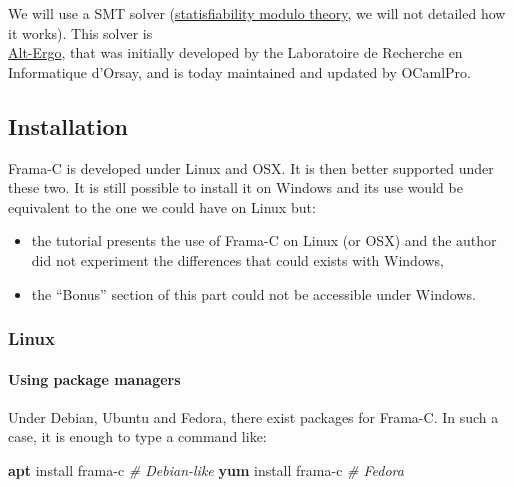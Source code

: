 \documentclass[12pt,francais,]{scrbook}
\newenvironment{Shaded}{}{}
\newcommand{\KeywordTok}[1]{\textcolor[rgb]{0.00,0.44,0.13}{\textbf{{#1}}}}
\newcommand{\CommentTok}[1]{\textcolor[rgb]{0.38,0.63,0.69}{\textit{{#1}}}}
\newcommand{\NormalTok}[1]{{#1}}
\newenvironment{zdsalertblock}[1]{%
  \tcolorbox[beamer,%
    noparskip,breakable,
    colback=LightCoral,colframe=DarkRed,%
    colbacklower=Tomato,%
    title=#1]
}{\endtcolorbox}
\begin{document}
We will use a SMT solver
(\href{https://en.wikipedia.org/wiki/Satisfiability_modulo_theories}{statisfiability
modulo theory}, we will not detailed how it works). This solver is\\
\href{http://alt-ergo.lri.fr/}{Alt-Ergo}, that was initially developed
by the Laboratoire de Recherche en Informatique d'Orsay, and is today
maintained and updated by OCamlPro.

\subsection{Installation}\label{installation}

Frama-C is developed under Linux and OSX. It is then better supported
under these two. It is still possible to install it on Windows and its
use would be equivalent to the one we could have on Linux but:

\begin{zdsalertblock}{Warning}
  \begin{itemize}
  \item the tutorial presents the use of Frama-C on Linux (or OSX) and
    the author did not experiment the differences that could exists with Windows,
  \item the ``Bonus'' section of this part could not be accessible under Windows.
  \end{itemize}
\end{zdsalertblock}
  
\subsubsection{Linux}\label{linux}

\paragraph{Using package managers}\label{using-package-managers}

Under Debian, Ubuntu and Fedora, there exist packages for Frama-C. In
such a case, it is enough to type a command like:

\begin{footnotesize}\begin{Shaded}
\begin{Highlighting}[]
\KeywordTok{apt} \NormalTok{install frama-c }\CommentTok{# Debian-like}
\KeywordTok{yum} \NormalTok{install frama-c }\CommentTok{# Fedora}
\end{Highlighting}
\end{Shaded}\end{footnotesize}
\end{document}
